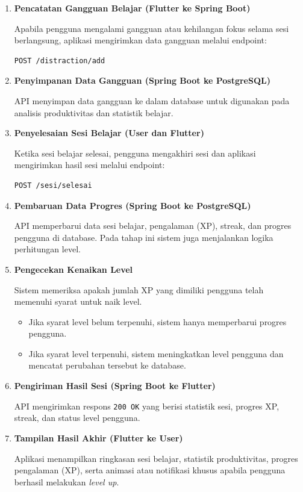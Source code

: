 \documentclass[11pt]{article}
\begin{document}
\begin{enumerate}
\item \textbf{Pencatatan Gangguan Belajar (Flutter ke Spring Boot)}

Apabila pengguna mengalami gangguan atau kehilangan fokus selama sesi berlangsung, aplikasi mengirimkan data gangguan melalui endpoint:

\begin{verbatim}
POST /distraction/add
\end{verbatim}

\item \textbf{Penyimpanan Data Gangguan (Spring Boot ke PostgreSQL)}

API menyimpan data gangguan ke dalam database untuk digunakan pada analisis produktivitas dan statistik belajar.

\item \textbf{Penyelesaian Sesi Belajar (User dan Flutter)}

Ketika sesi belajar selesai, pengguna mengakhiri sesi dan aplikasi mengirimkan hasil sesi melalui endpoint:

\begin{verbatim}
POST /sesi/selesai
\end{verbatim}

\item \textbf{Pembaruan Data Progres (Spring Boot ke PostgreSQL)}

API memperbarui data sesi belajar, pengalaman (XP), streak, dan progres pengguna di database. Pada tahap ini sistem juga menjalankan logika perhitungan level.

\item \textbf{Pengecekan Kenaikan Level}

Sistem memeriksa apakah jumlah XP yang dimiliki pengguna telah memenuhi syarat untuk naik level.

\begin{itemize}

\item Jika syarat level belum terpenuhi, sistem hanya memperbarui progres pengguna.

\item Jika syarat level terpenuhi, sistem meningkatkan level pengguna dan mencatat perubahan tersebut ke database.

\end{itemize}

\item \textbf{Pengiriman Hasil Sesi (Spring Boot ke Flutter)}

API mengirimkan respons \texttt{200 OK} yang berisi statistik sesi, progres XP, streak, dan status level pengguna.

\item \textbf{Tampilan Hasil Akhir (Flutter ke User)}

Aplikasi menampilkan ringkasan sesi belajar, statistik produktivitas, progres pengalaman (XP), serta animasi atau notifikasi khusus apabila pengguna berhasil melakukan \textit{level up}.

\end{enumerate}
\end{document}
